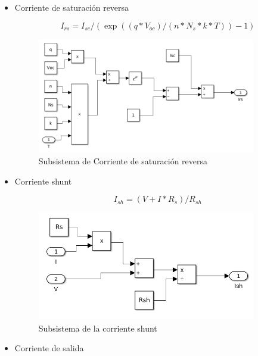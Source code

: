 \documentclass[a4paper,12pt]{article}
\begin{document}
\begin{itemize}
		\newpage
		
		\item Corriente de saturación reversa
		
			\begin{equation*}
				I_{rs} = I_{sc} / (\exp((q*V_{oc})/(n*N_s*k*T ))-1)
			\end{equation*}
			
			\begin{figure}[htb]
				\centering
				\includegraphics[width=0.9\textwidth]{./imagenes/simulink5.png}
				\caption{Subsistema de Corriente de saturación reversa}
			\end{figure}
		
		\item Corriente shunt
		
			\begin{equation*}
				I_{sh} = (V +I*R_s)/R_{sh}
			\end{equation*}
			
			\begin{figure}[htb]
				\centering
				\includegraphics[width=0.9\textwidth]{./imagenes/simulink6.png}
				\caption{Subsistema de la corriente shunt}
			\end{figure} 
		
		\newpage
		
		\item Corriente de salida
		

\end{itemize}
\end{document}
